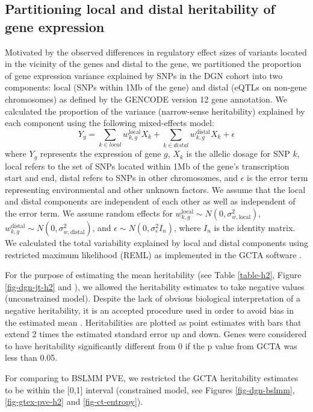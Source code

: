 \documentclass[10pt,letterpaper]{article}
\begin{document}
\subsection*{Partitioning local and distal heritability of gene
expression}\label{partitioning-local-and-distal-heritability-of-gene-expression}

Motivated by the observed differences in regulatory effect sizes of variants located in the vicinity of the genes and distal to the gene,
we partitioned the proportion of gene expression variance explained by
SNPs in the DGN cohort into two components: local (SNPs within 1Mb of
the gene) and distal (eQTLs on non-gene chromosomes) as defined by the
GENCODE \cite{Harrow_2012} version 12 gene annotation. We calculated the
proportion of the variance (narrow-sense heritability) explained by each
component using the following mixed-effects model:
%
\[ Y_g = \sum_{k  \in local}w^\text{local}_{k,g} X_k + \sum_{k  \in distal}w^\text{distal}_{k,g} X_k + \epsilon \]
%
where $Y_g$ represents the expression of gene $g$, $X_k$ is the allelic dosage for SNP $k$, local refers to the set of SNPs located within 1Mb of the gene's transcription start and end, distal refers to SNPs in other chromosomes, and $\epsilon$ is the error term representing environmental and other unknown factors. We assume that the local and distal components are independent of each other as well as independent of the error term.
We assume random effects for \(w^\text{local}_{k,g} \sim N(0, \sigma^2_{w,\text{local}})\), \(w^\text{distal}_{k,g} \sim N(0, \sigma^2_{w,\text{distal}})\), and
\(\epsilon \sim N(0, \sigma^2_{\epsilon} I_n)\), where \(I_n\) is the
identity matrix. We calculated the total variability explained by local
and distal components using restricted
maximum likelihood (REML) as implemented in the GCTA software \cite{Yang_2011}. 

For the purpose of estimating the mean heritability (see Table \ref{table-h2}, Figure \ref{fig-dgn-jt-h2} and ), we allowed the heritability estimates to 
take negative values (unconstrained model). Despite the lack of obvious biological interpretation of a negative heritability, 
it is an accepted procedure used in order to avoid bias in the estimated mean \cite{Price_2011,Wright_2014}. Heritabilities are plotted as point estimates with bars that extend 2 times the estimated standard error up and down. Genes were considered to have heritability significantly different from 0 if the p value from GCTA was less than 0.05.

For comparing to BSLMM PVE, we restricted the GCTA heritability estimates to be within the [0,1] interval (constrained model, see Figures \ref{fig-dgn-bslmm}, \ref{fig-gtex-pve-h2} and \ref{fig-ct-entropy}). 
\end{document}
